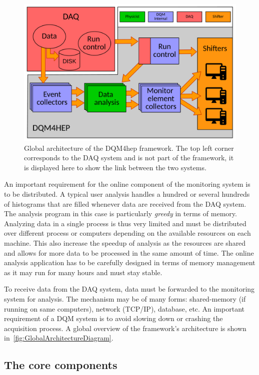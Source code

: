 \documentclass{webofc}
\begin{document}
\begin{figure}[!h]
  \centering
  \includegraphics[width=.95\textwidth]{figs/AnalysisModuleArchitecture.pdf}
  \caption{Global architecture of the DQM4hep framework. The top left corner corresponds to the DAQ system and is not part 
  of the framework, it is displayed here to show the link between the two systems.}
  \label{fig:GlobalArchitectureDiagram}
\end{figure}

An important requirement for the online component of the monitoring system is to be distributed. 
A typical user analysis handles a hundred or several hundreds of histograms that are filled whenever data are received from the DAQ system. 
The analysis program in this case is particularly \textit{greedy} in terms of memory. 
Analyzing data in a single process is thus very limited and must be distributed over different process or computers depending on the available resources on each machine.
This also increase the speedup of analysis as the resources are shared and allows for more data to be processed in the same amount of time.
The online analysis application has to be carefully designed in terms of memory management as it may run for many hours and must stay stable.

To receive data from the DAQ system, data must be forwarded to the monitoring system for analysis.
The mechanism may be of many forms: shared-memory (if running on same computers), network (TCP/IP), database, etc.
An important requirement of a DQM system is to avoid slowing down or crashing the acquisition process.
A global overview of the framework's architecture is shown in~\autoref{fig:GlobalArchitectureDiagram}.

\subsection{The core components}
\label{subsec:core}
\end{document}

